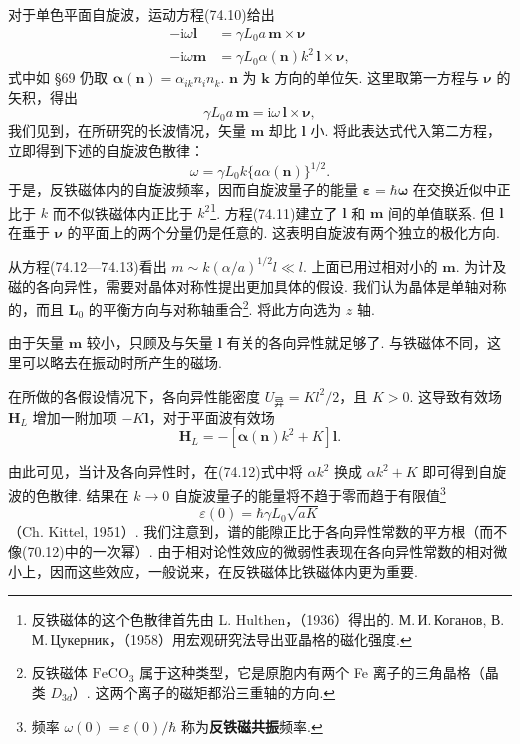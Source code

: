 对于单色平面自旋波，运动方程(74.10)给出
\begin{equation}
\begin{aligned}
-\mathrm{i}\omega\bm{l}&=\gamma L_0a\,\bm{m}\times\bm{\nu}\\
-\mathrm{i}\omega\bm{m}&=\gamma L_0\alpha(\bm{n})k^2\,\bm{l}\times\bm{\nu},
\end{aligned}
\end{equation}
式中如 §69 仍取 $\bm{\alpha}(\bm{n})=\alpha_{ik}n_in_k$. $\bm{n}$ 为 $\bm{k}$ 方向的单位矢. 这里取第一方程与 $\bm{\nu}$ 的矢积，得出
\begin{equation}
\gamma L_0a\,\bm{m}=\mathrm{i}\omega\,\bm{l}\times\bm{\nu},
\end{equation}
我们见到，在所研究的长波情况，矢量 $\bm{m}$ 却比 $\bm{l}$ 小. 将此表达式代入第二方程，立即得到下述的自旋波色散律：
\begin{equation}
\omega=\gamma L_0k\{a\alpha(\bm{n})\}^{1/2}.
\end{equation}
于是，反铁磁体内的自旋波频率，因而自旋波量子的能量 $\bm{\varepsilon}=\hbar\bm{\omega}$ 在交换近似中正比于 $k$ 而不似铁磁体内正比于 $k^2$\footnote{反铁磁体的这个色散律首先由 L. Hulthen，（1936）得出的. М.\,И.\,Коганов, В.\,М.\,Цукерник，（1958）用宏观研究法导出亚晶格的磁化强度.}. 方程(74.11)建立了 $\bm{l}$ 和 $\bm{m}$ 间的单值联系. 但 $\bm{l}$ 在垂于 $\bm{\nu}$ 的平面上的两个分量仍是任意的. 这表明自旋波有两个独立的极化方向.

从方程(74.12—74.13)看出 $m\sim k(\alpha/a)^{1/2}l\ll l$. 上面已用过相对小的 $\bm{m}$. 为计及磁的各向异性，需要对晶体对称性提出更加具体的假设. 我们认为晶体是单轴对称的，而且 $\bm{L}_0$ 的平衡方向与对称轴重合\footnote{反铁磁体 $\mathrm{FeCO_3}$ 属于这种类型，它是原胞内有两个 Fe 离子的三角晶格（晶类 $D_{3d}$）. 这两个离子的磁矩都沿三重轴的方向.}. 将此方向选为 $z$ 轴.

由于矢量 $\bm{m}$ 较小，只顾及与矢量 $\bm{l}$ 有关的各向异性就足够了. 与铁磁体不同，这里可以略去在振动时所产生的磁场.

在所做的各假设情况下，各向异性能密度 $U_{\text{异}}=Kl^2/2$，且 $K>0$. 这导致有效场 $\bm{H}_L$ 增加一附加项 $-K\bm{l}$，对于平面波有效场
\begin{equation}
\bm{H}_L=-[\bm{\alpha}(\bm{n})k^2+K]\bm{l}.
\end{equation}

由此可见，当计及各向异性时，在(74.12)式中将 $\alpha k^2$ 换成 $\alpha k^2+K$ 即可得到自旋波的色散律. 结果在 $k\to0$ 自旋波量子的能量将不趋于零而趋于有限值\footnote{频率 $\omega(0)=\varepsilon(0)/\hbar$ 称为\textbf{反铁磁共振}频率.}
\begin{equation}
\varepsilon(0)=\hbar\gamma L_0\sqrt{aK}
\end{equation}
（Ch. Kittel, 1951）. 我们注意到，谱的能隙正比于各向异性常数的平方根（而不像(70.12)中的一次幂）. 由于相对论性效应的微弱性表现在各向异性常数的相对微小上，因而这些效应，一般说来，在反铁磁体比铁磁体内更为重要.

